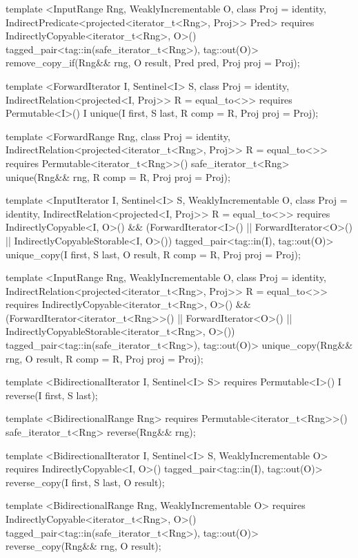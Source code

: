 \begin{codeblock}
{{{{  template <InputRange Rng, WeaklyIncrementable O, class Proj = identity,
      IndirectPredicate<projected<iterator_t<Rng>, Proj>> Pred>
    requires IndirectlyCopyable<iterator_t<Rng>, O>()
    tagged_pair<tag::in(safe_iterator_t<Rng>), tag::out(O)>
      remove_copy_if(Rng&& rng, O result, Pred pred, Proj proj = Proj{});

  template <ForwardIterator I, Sentinel<I> S, class Proj = identity,
      IndirectRelation<projected<I, Proj>> R = equal_to<>>
    requires Permutable<I>()
    I unique(I first, S last, R comp = R{}, Proj proj = Proj{});

  template <ForwardRange Rng, class Proj = identity,
      IndirectRelation<projected<iterator_t<Rng>, Proj>> R = equal_to<>>
    requires Permutable<iterator_t<Rng>>()
    safe_iterator_t<Rng>
      unique(Rng&& rng, R comp = R{}, Proj proj = Proj{});

  template <InputIterator I, Sentinel<I> S, WeaklyIncrementable O,
      class Proj = identity, IndirectRelation<projected<I, Proj>> R = equal_to<>>
    requires IndirectlyCopyable<I, O>() && (ForwardIterator<I>() ||
      ForwardIterator<O>() || IndirectlyCopyableStorable<I, O>())
    tagged_pair<tag::in(I), tag::out(O)>
      unique_copy(I first, S last, O result, R comp = R{}, Proj proj = Proj{});

  template <InputRange Rng, WeaklyIncrementable O, class Proj = identity,
      IndirectRelation<projected<iterator_t<Rng>, Proj>> R = equal_to<>>
    requires IndirectlyCopyable<iterator_t<Rng>, O>() &&
      (ForwardIterator<iterator_t<Rng>>() || ForwardIterator<O>() ||
       IndirectlyCopyableStorable<iterator_t<Rng>, O>())
    tagged_pair<tag::in(safe_iterator_t<Rng>), tag::out(O)>
      unique_copy(Rng&& rng, O result, R comp = R{}, Proj proj = Proj{});

  template <BidirectionalIterator I, Sentinel<I> S>
    requires Permutable<I>()
    I reverse(I first, S last);

  template <BidirectionalRange Rng>
    requires Permutable<iterator_t<Rng>>()
    safe_iterator_t<Rng>
      reverse(Rng&& rng);

  template <BidirectionalIterator I, Sentinel<I> S, WeaklyIncrementable O>
    requires IndirectlyCopyable<I, O>()
    tagged_pair<tag::in(I), tag::out(O)> reverse_copy(I first, S last, O result);

  template <BidirectionalRange Rng, WeaklyIncrementable O>
    requires IndirectlyCopyable<iterator_t<Rng>, O>()
    tagged_pair<tag::in(safe_iterator_t<Rng>), tag::out(O)>
      reverse_copy(Rng&& rng, O result);

}}}}
\end{codeblock}

